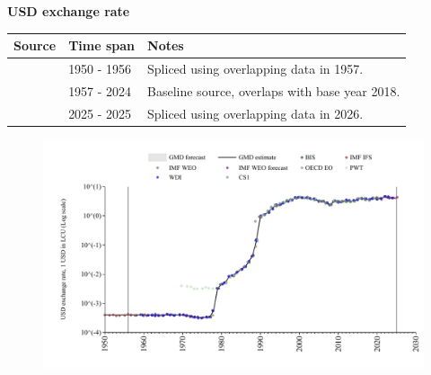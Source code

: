 \documentclass[12pt,a4paper,landscape]{article}
\begin{document}
\begin{adjustbox}{max totalsize={\paperwidth}{\paperheight},center}
\begin{minipage}[t][\textheight][t]{\textwidth}
\vspace*{0.5cm}
{}
\begin{center}
{\Large\bfseries USD exchange rate}
\end{center}
\vspace{0.5cm}
\begin{table}[H]
\centering
\small
\begin{tabular}{|l|l|l|}
\hline
\textbf{Source} & \textbf{Time span} & \textbf{Notes} \\
\hline
\rowcolor{white}\cite{IMF_IFS}& 1950 - 1956 &Spliced using overlapping data in 1957. \\
\rowcolor{lightgray}\cite{BIS}& 1957 - 2024 &Baseline source, overlaps with base year 2018. \\
\rowcolor{white}\cite{OECD_EO}& 2025 - 2025 &Spliced using overlapping data in 2026. \\
\hline
\end{tabular}
\end{table}
\begin{figure}[H]
\centering
\includegraphics[width=\textwidth,height=0.6\textheight,keepaspectratio]{graphs/POL_USDfx.pdf}
\end{figure}
\end{minipage}
\end{adjustbox}
\end{document}
